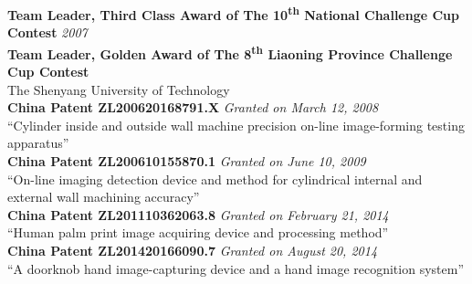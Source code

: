 \documentclass{article}
\newenvironment{changemargin}[2]{%
  \begin{list}{}{%
    \setlength{\topsep}{0pt}%
    \setlength{\leftmargin}{#1}%
    \setlength{\rightmargin}{#2}%
    \setlength{\listparindent}{\parindent}%
    \setlength{\itemindent}{\parindent}%
    \setlength{\parsep}{\parskip}%
  }%
  \item[]}{\end{list}
}
\newenvironment{body} {
	\vspace*{-16pt}
	\begin{changemargin}{-0.25in}{-0.5in}
  }	
	{\end{changemargin}
}
\begin{document}
\begin{body}
	\vspace{14pt}	
    \textbf{Team Leader, Third Class Award of The 10\textsuperscript{th} National Challenge Cup Contest} \hfill{} \emph{2007}\\
    \textbf{Team Leader, Golden Award of The 8\textsuperscript{th} Liaoning Province Challenge Cup Contest}\\
    The Shenyang University of Technology\\
    \medskip
    \textbf{China Patent ZL200620168791.X} \hfill{} \emph{Granted on March 12, 2008}\\
    ``Cylinder inside and outside wall machine precision on-line image-forming testing apparatus''\\
    \medskip	
    \textbf{China Patent ZL200610155870.1} \hfill{} \emph{Granted on June 10, 2009}\\
    ``On-line imaging detection device and method for cylindrical internal and external wall machining accuracy''\\
    \medskip    
    \textbf{China Patent ZL201110362063.8} \hfill{} \emph{Granted on February 21, 2014}\\
    ``Human palm print image acquiring device and processing method'' \\
    \medskip    
    \textbf{China Patent ZL201420166090.7}  \hfill{} \emph{Granted on August 20, 2014}\\
    ``A doorknob hand image-capturing device and a hand image recognition system''
\end{body}
\end{document}
